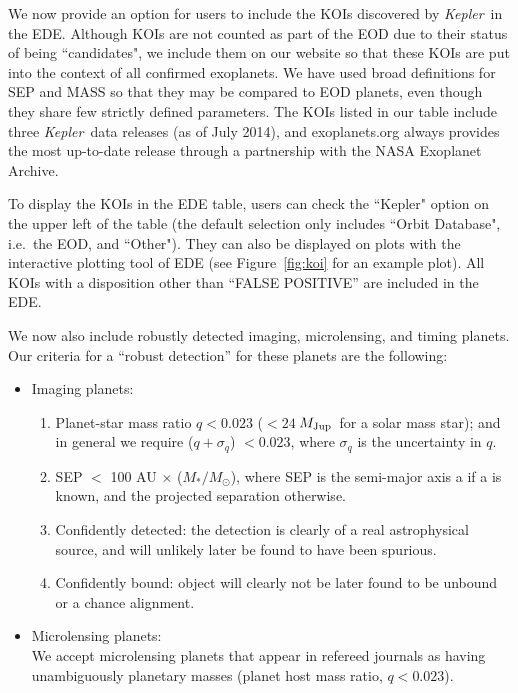 \documentclass[11pt,preprint]{aastex}
\def\kepler{\textit{Kepler}}
\def\mjup{$M_{\rm Jup}$}
\begin{document}
\begin{CJK*}{UTF8}{gbsn}
We now provide an option for users to include the KOIs discovered by \kepler\ in the
EDE. Although KOIs are not counted as part of the EOD due to their
status of being ``candidates", we include them on our website so that
these KOIs are put into the context of all confirmed exoplanets. We
have used broad definitions for SEP and MASS so that they may be
compared to EOD planets, even though they share few strictly defined parameters.  The
KOIs listed in our table include three \kepler\ data releases (as of
July 2014), and exoplanets.org always provides the most up-to-date
release through a partnership with the NASA Exoplanet Archive.  

To display the KOIs in the EDE table, users can check the ``Kepler" option on
the upper left of the table (the default selection only includes ``Orbit
Database", i.e.~the EOD, and ``Other"). They can also be displayed on
plots with the interactive plotting tool of EDE (see
Figure~\ref{fig:koi} for an example plot).  All KOIs with a
disposition other than ``FALSE POSITIVE'' are included in the EDE.

We now also include robustly detected imaging, microlensing,
and timing planets.  Our criteria for a ``robust detection'' for these
planets are the
following:

\begin{itemize}
\item Imaging planets:
\begin{enumerate}
\item Planet-star mass ratio $q < 0.023$ ($< 24\ $\mjup\ for a solar
  mass star); and in general we require ($q+\sigma_q$) $< 0.023$,
  where $\sigma_q$ is the uncertainty in $q$.
\item SEP $<$ 100 AU $\times$ ($M_*/M_\odot$), where SEP is the
  semi-major axis a if a is known, and the projected separation
  otherwise.
\item Confidently detected: the detection is clearly of a real
  astrophysical source, and will unlikely later be found to have been
  spurious.
\item Confidently bound: object will clearly not
  be later found to be unbound or a chance alignment.

\end{enumerate}
\item Microlensing planets:\\
  We accept microlensing planets that appear in refereed journals as
  having unambiguously planetary masses (planet host mass ratio,
  $q<0.023$). 


\end{itemize}
\end{CJK*}
\end{document}
